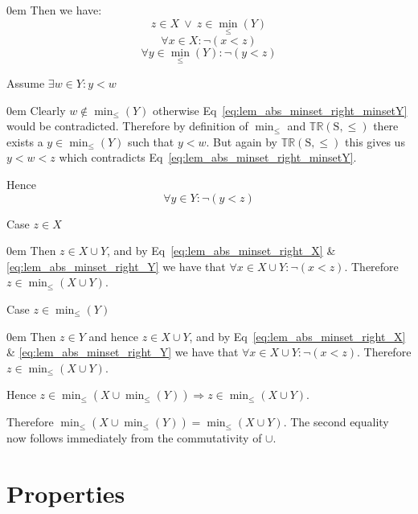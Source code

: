 \documentclass[10pt]{article}
\newcommand{\propname}[1]{{\mathbb{#1}}}
\newenvironment{ind}[0]{\begin{addmargin}[1em]{0em}\vspace{0.5em}}{\end{addmargin}\vspace{0.5em}}
\begin{document}
\begin{ind}
Then we have:
\begin{equation}
z \in X \ \vee \ z \in \min_\leq(Y)
\end{equation}
\begin{equation} \label{eq:lem_abs_minset_right_X}
\forall x \in X : \neg (x < z)
\end{equation}
\begin{equation} \label{eq:lem_abs_minset_right_minsetY}
\forall y \in \min_\leq(Y) : \neg (y < z)
\end{equation}

Assume $\exists w \in Y : y < w$
\begin{ind}
Clearly $w \notin \min_\leq(Y)$ otherwise Eq~\ref{eq:lem_abs_minset_right_minsetY} would be contradicted. Therefore by definition of $\min_\leq$ and $\propname{TR}(\mathrm{S, \leq})$ there exists a $y \in \min_\leq(Y)$ such that $y < w$. But again by $\propname{TR}(\mathrm{S, \leq})$ this gives us $y < w < z$ which contradicts Eq~\ref{eq:lem_abs_minset_right_minsetY}.
\end{ind}
Hence
\begin{equation} \label{eq:lem_abs_minset_right_Y}
\forall y \in Y : \neg (y < z)
\end{equation}

Case $z \in X$
\begin{ind}
Then $z \in X \cup Y$, and by Eq~\ref{eq:lem_abs_minset_right_X} \& \ref{eq:lem_abs_minset_right_Y} we have that $\forall x \in X \cup Y : \neg (x < z)$. Therefore $z \in \min_\leq(X \cup Y)$.
\end{ind}

Case $z \in \min_\leq(Y)$
\begin{ind}
Then $z \in Y$ and hence $z \in X \cup Y$, and by Eq~\ref{eq:lem_abs_minset_right_X} \& \ref{eq:lem_abs_minset_right_Y} we have that $\forall x \in X \cup Y : \neg (x < z)$. Therefore $z \in \min_\leq(X \cup Y)$.
\end{ind}
Hence $z \in \min_\leq(X \cup \min_\leq(Y)) \Rightarrow z \in \min_\leq(X \cup Y)$.
\end{ind}


\vspace{1em}

Therefore $\min_\leq(X \cup \min_\leq(Y)) = \min_\leq(X \cup Y)$. The second equality now follows immediately from the commutativity of $\cup$.

\section{Properties}
\end{document}
